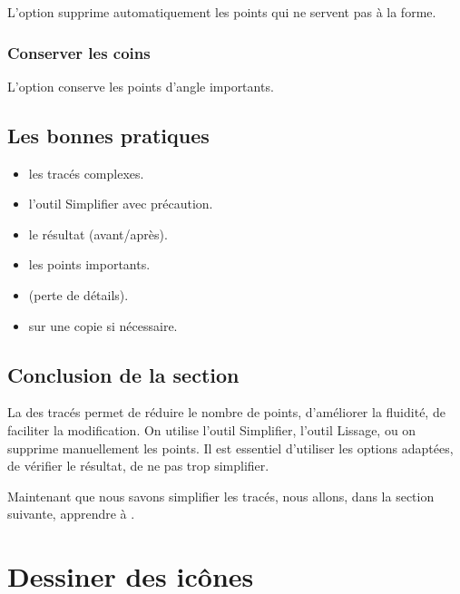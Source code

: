 L'option  supprime automatiquement les points qui ne servent pas à la forme.

\subsubsection{Conserver les coins}

L'option  conserve les points d'angle importants.

\subsection{Les bonnes pratiques}

\begin{itemize}
    \item {} les tracés complexes.
    \item {} l'outil Simplifier avec précaution.
    \item {} le résultat (avant/après).
    \item {} les points importants.
    \item {} (perte de détails).
    \item {} sur une copie si nécessaire.
\end{itemize}

\subsection*{Conclusion de la section}

La  des tracés permet de réduire le nombre de points, d'améliorer la fluidité, de faciliter la modification. On utilise l'outil Simplifier, l'outil Lissage, ou on supprime manuellement les points. Il est essentiel d'utiliser les options adaptées, de vérifier le résultat, de ne pas trop simplifier.

Maintenant que nous savons simplifier les tracés, nous allons, dans la section suivante, apprendre à .

\section{Dessiner des icônes}

